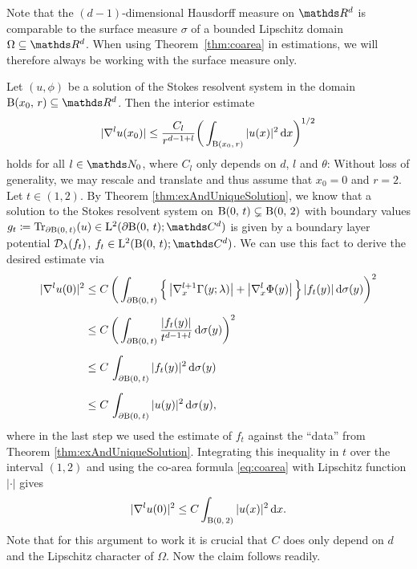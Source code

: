 Note that the $(d-1)$-dimensional Hausdorff measure on $\R^d$ is comparable to the surface measure $\sigma$ of a bounded Lipschitz domain $\Omega \subseteq \R^d$.
When using Theorem~\ref{thm:coarea} in estimations, we will therefore always be working with the surface measure only.

\begin{rem}
  Let $(u,\phi)$ be a solution of the Stokes resolvent system in the domain $\BB(x_0,\, r) \subseteq \R^d$.
  Then the interior estimate
  \begin{align}
    \label{eq:interiorEstimateDoubleLayer}
    |\nabla^l u(x_0) | \leq \frac{C_l}{r^{d - 1 + l}} \bigg( \int_{\mathrm{B}(x_0,\, r)} |u(x)|^2 \, {\operatorname{d}\!{x}} \bigg)^{1/2}
  \end{align}
  holds for all $l \in \N_0$, where $C_l$ only depends on $d$, $l$ and $\theta$:
  Without loss of generality, we may rescale and translate and thus assume that $x_0 = 0$ and $r = 2$.
  Let $t \in (1,2)$. 
  By Theorem \ref{thm:exAndUniqueSolution}, we know that a solution to the Stokes resolvent system on $\mathrm{B}(0,\, t) \subsetneq \mathrm{B}(0,\,2)$ with boundary values $g_t \coloneqq \operatorname{Tr}_{\partial\BB(0,\,t)} (u) \in \Ell^2(\partial\BB(0,\,t); \C^d)$ is given by a boundary layer potential $\mathcal{D}_\lambda(f_t)$, $f_t \in \Ell^2(\BB(0,\,t); \C^d)$.
  We can use this fact to derive the desired estimate via
  \begin{align*}
    |\nabla^l u(0)|^2 
    &\leq C\, \bigg( \int_{\partial \mathrm{B}(0,\, t)} \Big\{ \, \big|\nabla_x^{l+1} \Gamma(y; \lambda)\big|  + \big|\nabla_x^l \Phi(y) \big| \, \Big\} \, |f_t(y)| \, {\operatorname{d}\!{\sigma}}(y)\bigg)^2 \\[0.5em]
    &\leq C\, \bigg( \int_{\partial \mathrm{B}(0,\,t)} \frac{|f_t(y)|}{t^{d - 1 + l}}  \, {\operatorname{d}\!{\sigma}}(y)\bigg)^2 \\[0.5em]
    &\leq C\, \int_{\partial \mathrm{B}(0,\,t)} |f_t(y)|^2  \, {\operatorname{d}\!{\sigma}}(y) \\[0.5em]
    &\leq C\, \int_{\partial \mathrm{B}(0,\,t)} |u(y)|^2 \, {\operatorname{d}\!{\sigma}}(y), 
  \end{align*}
  where in the last step we used the estimate of $f_t$ against the ``data'' from Theorem \ref{thm:exAndUniqueSolution}.
  Integrating this inequality in $t$ over the interval $(1,2)$ and using the co-area formula \eqref{eq:coarea} with Lipschitz function $|\cdot|$ gives 
  \begin{align*}
    |\nabla^l u(0)|^2 \leq C \int_{\mathrm{B}(0,\,2)} |u(x)|^2 \, {\operatorname{d}\!{x}}.
  \end{align*}
  Note that for this argument to work it is crucial that $C$ does only depend on $d$ and the Lipschitz character of $\Omega$.
  Now the claim follows readily.
\end{rem}

